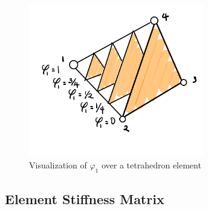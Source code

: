 \documentclass[11pt,titlepage]{article}
\begin{document}
\begin{figure}[!htbp]
\begin{center}
    \includegraphics[width=3in]{screenshots/linear_tet_basis}
    \caption{Visualization of $\varphi_1$ over a tetrahedron element}
\end{center}
\end{figure}

\subsection{Element Stiffness Matrix}
\end{document}
